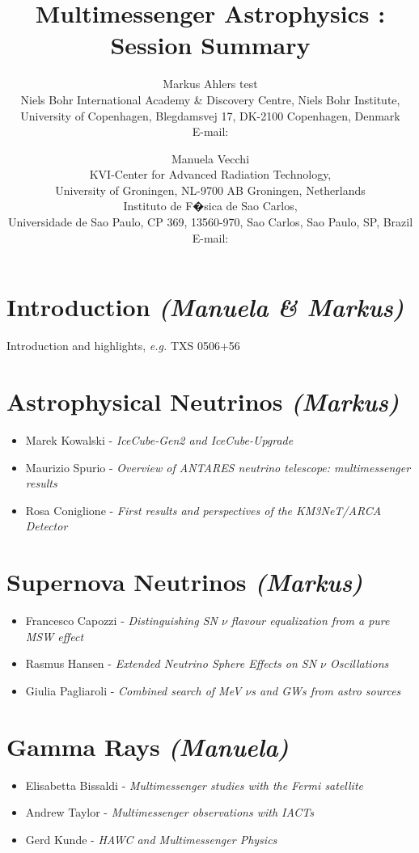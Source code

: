 \documentclass{PoS}
\title{Multimessenger Astrophysics : Session Summary}
\author{Markus Ahlers test\\
        Niels Bohr International Academy \& Discovery Centre, Niels Bohr Institute,\\University of Copenhagen, Blegdamsvej 17, DK-2100 Copenhagen, Denmark\\
        E-mail: \email{markus.ahlers@nbi.ku.dk}}
\author{Manuela Vecchi\\
       KVI-Center for Advanced Radiation Technology,\\University of Groningen, NL-9700 AB Groningen, Netherlands\\Instituto de F�sica de Sao Carlos,\\ Universidade de Sao Paulo, CP 369, 13560-970, Sao Carlos, Sao Paulo, SP, Brazil\\
        E-mail: \email{m.vecchi@rug.nl}}
\begin{document}
\section{Introduction {\it (Manuela \& Markus)}}

Introduction and highlights, {\it e.g.} TXS 0506+56~\cite{IceCube:2018cha,IceCube:2018dnn}

\section{Astrophysical Neutrinos {\it (Markus)}}

\begin{itemize}
\item Marek Kowalski - {\it IceCube-Gen2 and IceCube-Upgrade}~\cite{Aartsen:2014njl}
\item Maurizio Spurio - {\it Overview of ANTARES neutrino telescope: multimessenger results }
\item Rosa Coniglione - {\it First results and perspectives of the KM3NeT/ARCA Detector}~\cite{Adrian-Martinez:2016fdl}
\end{itemize}

\section{Supernova Neutrinos {\it (Markus)}}

\begin{itemize}
\item Francesco Capozzi - {\it Distinguishing SN $\nu$ flavour equalization from a pure MSW effect}
\item Rasmus Hansen - {\it Extended Neutrino Sphere Effects on SN $\nu$ Oscillations}
\item Giulia Pagliaroli - {\it Combined search of MeV $\nu$s and GWs from astro sources}
\end{itemize}

\section{Gamma Rays {\it (Manuela)}}

\begin{itemize}
\item Elisabetta Bissaldi - {\it Multimessenger studies with the Fermi satellite}
\item Andrew Taylor - {\it Multimessenger observations with IACTs}
\item Gerd Kunde - {\it HAWC and Multimessenger Physics}
\end{itemize}
\end{document}
